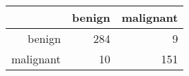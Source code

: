 \begin{tabular}{rrr}
  \hline
 & benign & malignant \\ 
  \hline
benign & 284 &   9 \\ 
  malignant &  10 & 151 \\ 
   \hline
\end{tabular}
